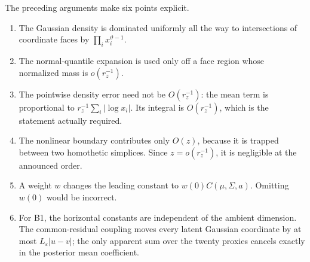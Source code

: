 \begin{remark}
\label{rem:corner-coupling-repairs}
The preceding arguments make six points explicit.

\begin{enumerate}
\item The Gaussian density is dominated uniformly all the way to
intersections of coordinate faces by
\(\prod_i x_i^{\vartheta-1}\).

\item The normal-quantile expansion is used only off a face region
whose normalized mass is \(o(r_z^{-1})\).

\item The pointwise density error need not be \(O(r_z^{-1})\):
the mean term is proportional to
\(r_z^{-1}\sum_i|\log x_i|\). Its integral is
\(O(r_z^{-1})\), which is the statement actually required.

\item The nonlinear boundary contributes only \(O(z)\), because it
is trapped between two homothetic simplices. Since
\(z=o(r_z^{-1})\), it is negligible at the announced order.

\item A weight \(w\) changes the leading constant to
\(w(0)C(\mu,\Sigma,a)\). Omitting \(w(0)\) would be incorrect.

\item For B1, the horizontal constants are independent of the
ambient dimension. The common-residual coupling moves every
latent Gaussian coordinate by at most
\(L_\varepsilon|u-v|\); the only apparent sum over the twenty
proxies cancels exactly in the posterior mean coefficient.
\end{enumerate}
\end{remark}